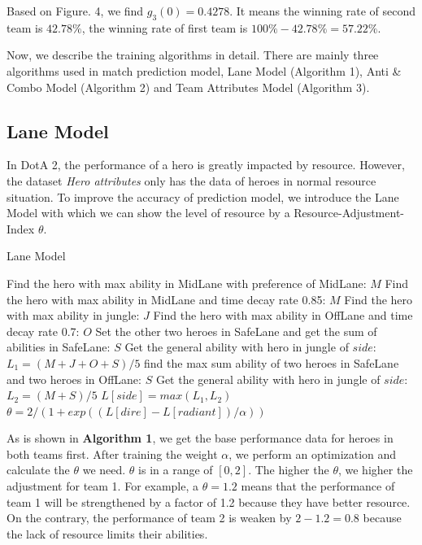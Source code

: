 \documentclass[letterpaper, 10 pt, conference]{ieeeconf}  %
\begin{document}
Based on Figure. 4, we find $g_3(0) = 0.4278$. It means the winning rate of second team is $42.78\%$, the winning rate of first team is $100\% - 42.78\% = 57.22\%$.

Now, we describe the training algorithms in detail. There are mainly three algorithms used in match prediction model, Lane Model (Algorithm 1), Anti \& Combo Model (Algorithm 2) and Team Attributes Model (Algorithm 3).

\subsection{Lane Model}

In DotA 2, the performance of a hero is greatly impacted by resource. However, the dataset \textit{Hero attributes} only has the data of heroes in normal resource situation. To improve the accuracy of prediction model, we introduce the Lane Model with which we can show the level of resource by a Resource-Adjustment-Index $\theta$. 

\begin{algorithm*}
\caption{Lane Model}
\begin{algorithmic}
            \State Find the hero with max ability in MidLane with preference of MidLane: $M$
        \Else
            \State Find the hero with max ability in MidLane and time decay rate 0.85: $M$
        \EndIf
            \State Find the hero with  max ability in jungle: $J$
            \State Find the hero with  max ability in OffLane and time decay rate 0.7: $O$
            \State Set the other two heroes in SafeLane and get the sum of abilities in SafeLane: $S$
            \State Get the general ability with hero in jungle of $side$: $L_1 = (M+J+O+S)/5$
        \Else
            \State find the max sum ability of two heroes in SafeLane and two heroes in OffLane: $S$
            \State Get the general ability with hero in jungle of $side$: $L_2 = (M+S)/5$
        \EndIf
        \State $L[side] = max(L_1, L_2)$ 
    \EndFor
\State $\theta = 2 / (1 + exp((L[dire] - L[radiant]) / \alpha))$
\EndFunction
\end{algorithmic}
\end{algorithm*}

As is shown in \textbf{Algorithm 1}, we get the base performance data for heroes in both teams first. After training the weight $\alpha$, we perform an optimization and calculate the $\theta$ we need. $\theta$ is in a range of $[0, 2]$. The higher the $\theta$, we higher the adjustment for team 1. For example, a $\theta = 1.2$ means that the performance of team 1 will be strengthened by a factor of 1.2 because they have better resource. On the contrary, the performance of team 2 is weaken by $2 - 1.2 = 0.8$ because the lack of resource limits their abilities. 
\end{document}
